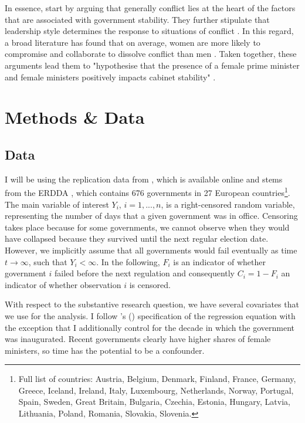 \documentclass[11pt]{article}
\newcommand\possecite[1]{\citeauthor{#1}'s (\citeyear{#1})}
\begin{document}
In essence, \textcite{KK20} start by arguing that generally conflict lies at the heart of the factors that are associated with government stability. They further stipulate that leadership style determines the response to situations of conflict \parencite{KK20}. In this regard, a broad literature has found that on average, women are more likely to compromise and collaborate to dissolve conflict than men \parencite[e.g.][]{rhode2017women}. Taken together, these arguments lead them to "hypothesise that the presence of a female prime minister and female ministers positively impacts cabinet stability" \parencite[4]{KK20}.


\section{Methods \& Data}
\subsection{Data}
I will be using the replication data from \textcite{KK20}, which is available online and stems from the ERDDA \parencite{ERD2014}, which contains 676 governments in 27 European countries\footnote{Full list of countries: Austria, Belgium, Denmark, Finland, France, Germany, Greece, Iceland, Ireland, Italy, Luxembourg, Netherlands, Norway, Portugal, Spain, Sweden, Great Britain, Bulgaria, Czechia, Estonia, Hungary, Latvia, Lithuania, Poland, Romania, Slovakia, Slovenia.}. The main variable of interest $Y_i$, $i = 1, ..., n$, is a right-censored random variable, representing the number of days that a given government was in office. Censoring takes place because for some governments, we cannot observe when they would have collapsed because they survived until the next regular election date. However, we implicitly assume that all governments would fail eventually as time $t \to \infty$, such that $Y_i < \infty$. In the following, $F_i$ is an indicator of whether government $i$ failed before the next regulation and consequently $C_i = 1-F_i$ an indicator of whether observation $i$ is censored. 

With respect to the substantive research question, we have several covariates that we use for the analysis. I follow \possecite{KK20} specification of the regression equation with the exception that I additionally control for the decade in which the government was inaugurated. Recent governments clearly have higher shares of female ministers, so time has the potential to be a confounder. 
\end{document}
